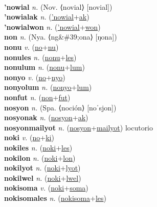  \label{'nolkatilip} \\
\textbf{'nowial} \textit{n.} (Nov. ⟨novial⟩ [novial])
 \label{'nowial} \\
\textbf{'nowialak} \textit{n.} (\hyperref['nowial]{'nowial}+\hyperref[ak]{ak})
 \label{'nowialak} \\
\textbf{'nowialwon} \textit{n.} (\hyperref['nowial]{'nowial}+\hyperref[won]{won})
 \label{'nowialwon} \\
\textbf{non} \textit{n.} (Nya. ⟨ng\&\#39;ona⟩ [ŋona])
 \label{non} \\
\textbf{nonu} \textit{v.} (\hyperref[no]{no}+\hyperref[nu]{nu})
 \label{nonu} \\
\textbf{nonules} \textit{n.} (\hyperref[nonu]{nonu}+\hyperref[les]{les})
 \label{nonules} \\
\textbf{nonulum} \textit{n.} (\hyperref[nonu]{nonu}+\hyperref[lum]{lum})
 \label{nonulum} \\
\textbf{nonyo} \textit{v.} (\hyperref[no]{no}+\hyperref[nyo]{nyo})
 \label{nonyo} \\
\textbf{nonyolum} \textit{n.} (\hyperref[nonyo]{nonyo}+\hyperref[lum]{lum})
 \label{nonyolum} \\
\textbf{nonfut} \textit{n.} (\hyperref[non]{non}+\hyperref[fut]{fut})
 \label{nonfut} \\
\textbf{nosyon} \textit{n.} (Spa. ⟨noción⟩ [noˈsjon])
 \label{nosyon} \\
\textbf{nosyonak} \textit{n.} (\hyperref[nosyon]{nosyon}+\hyperref[ak]{ak})
 \label{nosyonak} \\
\textbf{nosyonmailyot} \textit{n.} (\hyperref[nosyon]{nosyon}+\hyperref[mailyot]{mailyot})
locutorio \label{nosyonmailyot} \\
\textbf{noki} \textit{v.} (\hyperref[no]{no}+\hyperref[ki]{ki})
 \label{noki} \\
\textbf{nokiles} \textit{n.} (\hyperref[noki]{noki}+\hyperref[les]{les})
 \label{nokiles} \\
\textbf{nokilon} \textit{n.} (\hyperref[noki]{noki}+\hyperref[lon]{lon})
 \label{nokilon} \\
\textbf{nokilyot} \textit{n.} (\hyperref[noki]{noki}+\hyperref[lyot]{lyot})
 \label{nokilyot} \\
\textbf{nokilwel} \textit{n.} (\hyperref[noki]{noki}+\hyperref[lwel]{lwel})
 \label{nokilwel} \\
\textbf{nokisoma} \textit{v.} (\hyperref[noki]{noki}+\hyperref[soma]{soma})
 \label{nokisoma} \\
\textbf{nokisomales} \textit{n.} (\hyperref[nokisoma]{nokisoma}+\hyperref[les]{les})
